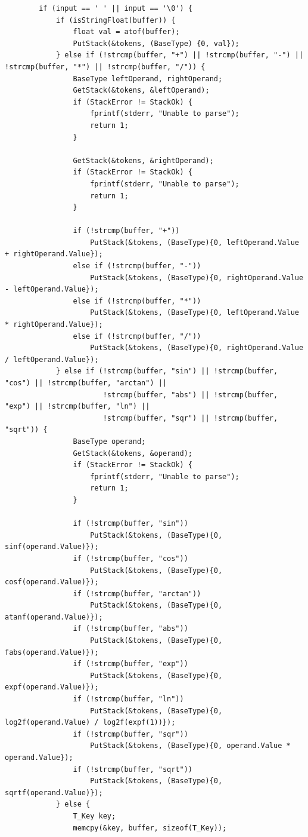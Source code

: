 \documentclass[a4paper,14pt]{extarticle}
\begin{document}
\begin{enumerate}
\begin{verbatim}
        if (input == ' ' || input == '\0') {
            if (isStringFloat(buffer)) {
                float val = atof(buffer);
                PutStack(&tokens, (BaseType) {0, val});
            } else if (!strcmp(buffer, "+") || !strcmp(buffer, "-") || !strcmp(buffer, "*") || !strcmp(buffer, "/")) {
                BaseType leftOperand, rightOperand;
                GetStack(&tokens, &leftOperand);
                if (StackError != StackOk) {
                    fprintf(stderr, "Unable to parse");
                    return 1;
                }

                GetStack(&tokens, &rightOperand);
                if (StackError != StackOk) {
                    fprintf(stderr, "Unable to parse");
                    return 1;
                }

                if (!strcmp(buffer, "+"))
                    PutStack(&tokens, (BaseType){0, leftOperand.Value + rightOperand.Value});
                else if (!strcmp(buffer, "-"))
                    PutStack(&tokens, (BaseType){0, rightOperand.Value - leftOperand.Value}); 
                else if (!strcmp(buffer, "*"))
                    PutStack(&tokens, (BaseType){0, leftOperand.Value * rightOperand.Value}); 
                else if (!strcmp(buffer, "/"))
                    PutStack(&tokens, (BaseType){0, rightOperand.Value / leftOperand.Value}); 
            } else if (!strcmp(buffer, "sin") || !strcmp(buffer, "cos") || !strcmp(buffer, "arctan") || 
                       !strcmp(buffer, "abs") || !strcmp(buffer, "exp") || !strcmp(buffer, "ln") ||
                       !strcmp(buffer, "sqr") || !strcmp(buffer, "sqrt")) {
                BaseType operand;
                GetStack(&tokens, &operand);
                if (StackError != StackOk) {
                    fprintf(stderr, "Unable to parse");
                    return 1;
                }

                if (!strcmp(buffer, "sin"))
                    PutStack(&tokens, (BaseType){0, sinf(operand.Value)});
                if (!strcmp(buffer, "cos"))
                    PutStack(&tokens, (BaseType){0, cosf(operand.Value)});
                if (!strcmp(buffer, "arctan"))
                    PutStack(&tokens, (BaseType){0, atanf(operand.Value)});
                if (!strcmp(buffer, "abs"))
                    PutStack(&tokens, (BaseType){0, fabs(operand.Value)});
                if (!strcmp(buffer, "exp"))
                    PutStack(&tokens, (BaseType){0, expf(operand.Value)});
                if (!strcmp(buffer, "ln"))
                    PutStack(&tokens, (BaseType){0, log2f(operand.Value) / log2f(expf(1))});
                if (!strcmp(buffer, "sqr"))
                    PutStack(&tokens, (BaseType){0, operand.Value * operand.Value});
                if (!strcmp(buffer, "sqrt"))
                    PutStack(&tokens, (BaseType){0, sqrtf(operand.Value)});
            } else {
                T_Key key;
                memcpy(&key, buffer, sizeof(T_Key));


\end{verbatim}
\end{enumerate}
\end{document}
